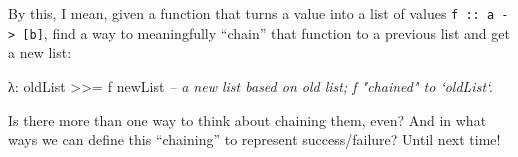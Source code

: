 \documentclass[]{article}
\newenvironment{Shaded}{}{}
\newcommand{\CommentTok}[1]{\textcolor[rgb]{0.38,0.63,0.69}{\textit{{#1}}}}
\newcommand{\FunctionTok}[1]{\textcolor[rgb]{0.02,0.16,0.49}{{#1}}}
\newcommand{\NormalTok}[1]{{#1}}
\begin{document}
By this, I mean, given a function that turns a value into a list of
values \texttt{f\ ::\ a\ -\textgreater{}\ {[}b{]}}, find a way to
meaningfully ``chain'' that function to a previous list and get a new
list:

\begin{Shaded}
\begin{Highlighting}[]
\NormalTok{λ}\FunctionTok{:} \NormalTok{oldList }\FunctionTok{>>=} \NormalTok{f}
\NormalTok{newList             }\CommentTok{-- a new list based on old list; f "chained" to `oldList`.}
\end{Highlighting}
\end{Shaded}

Is there more than one way to think about chaining them, even? And in
what ways we can define this ``chaining'' to represent success/failure?
Until next time!
\end{document}
